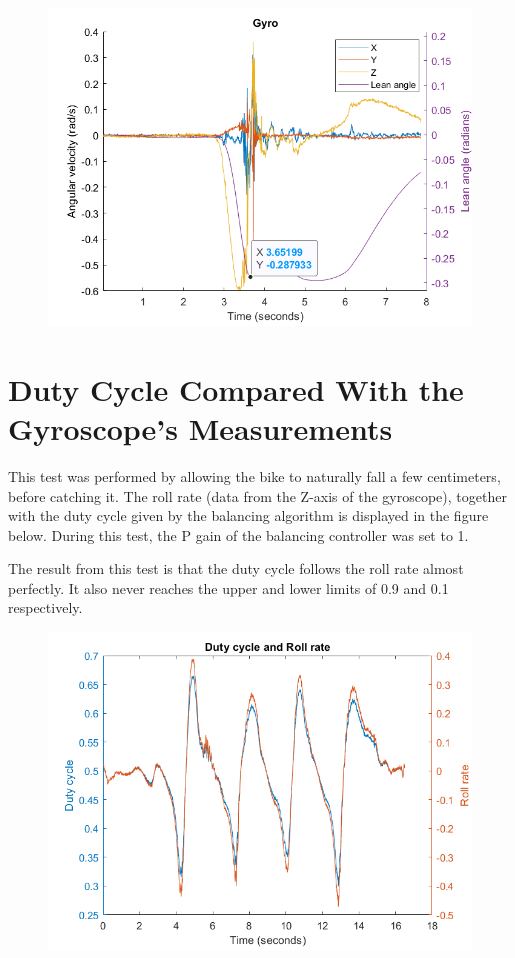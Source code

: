 \begin{figure}[h]
    \centering
    \includegraphics[width=\textwidth]{figure/gyroAngleTestCorrected.png}
\end{figure}

\newpage

\section{Duty Cycle Compared With the Gyroscope's Measurements}

This test was performed by allowing the bike to naturally fall a few centimeters, before catching it. The roll rate (data from the Z-axis of the gyroscope), together with the duty cycle given by the balancing algorithm is displayed in the figure below. During this test, the P gain of the balancing controller was set to 1.

The result from this test is that the duty cycle follows the roll rate almost perfectly. It also never reaches the upper and lower limits of 0.9 and 0.1 respectively.

\begin{figure}[h]
    \centering
    \includegraphics[width=\textwidth]{figure/pwmVsRollRate.png}
\end{figure}

